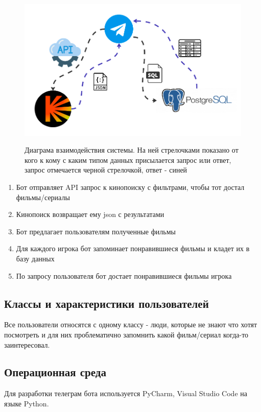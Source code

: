 \documentclass{article}
\begin{document}
\begin{figure}[htbp]
  \centering
    \centering
    \includegraphics[width=1\textwidth]{project_structure.png}
    \label{fig:project diogram}
    \caption{Диаграма взаимодействия системы. На ней стрелочками показано от кого к кому с каким типом данных присылается запрос или ответ, запрос отмечается черной стрелочкой, ответ - синей}
  \label{fig:project structure}
\end{figure}



\begin{enumerate}
    \item Бот отправляет API запрос к кинопоиску с фильтрами, чтобы тот достал фильмы/сериалы
    \item Кинопоиск возвращает ему json с результатами
    \item Бот предлагает пользователям полученные фильмы
    \item Для каждого игрока бот запоминает понравившиеся фильмы и кладет их в базу данных
    \item По запросу пользователя бот достает понравившиеся фильмы игрока
\end{enumerate}

\subsection{Классы и характеристики пользователей}

Все пользователи относятся с одному классу - люди, которые не знают что хотят посмотреть и для них проблематично запомнить какой фильм/сериал когда-то заинтересовал.

\subsection{Операционная среда}
Для разработки телеграм бота используется PyCharm, Visual Studio Code на языке Python.
\end{document}
